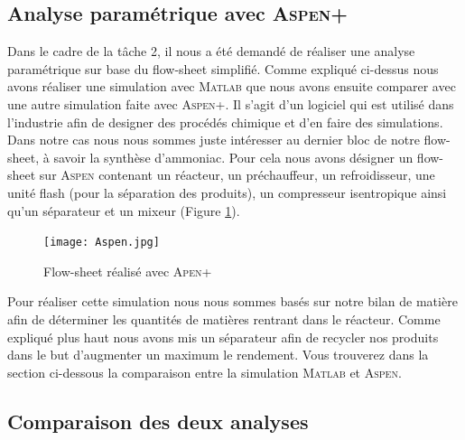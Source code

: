 \subsection{Analyse paramétrique avec \textsc{Aspen+}}
Dans le cadre de la tâche 2, il nous a été demandé de réaliser une analyse paramétrique sur base du flow-sheet simplifié. Comme expliqué ci-dessus nous avons réaliser une simulation avec \textsc{Matlab} que nous avons ensuite comparer avec une autre simulation faite avec \textsc{Aspen+}. Il s'agit d'un logiciel qui est utilisé dans l'industrie afin de designer des procédés chimique et d'en faire des simulations. Dans notre cas nous nous sommes juste intéresser au dernier bloc de notre flow-sheet, à savoir la synthèse d'ammoniac. Pour cela nous avons désigner un flow-sheet sur \textsc{Aspen} contenant un réacteur, un préchauffeur, un refroidisseur, une unité flash (pour la séparation des produits), un compresseur isentropique ainsi qu'un séparateur et un mixeur (Figure \ref{Aspen}).
\begin{figure}[ht!]
 \centering
 \texttt{[image: Aspen.jpg]}
 \caption{Flow-sheet réalisé avec \textsc{Apen+}}
 \label{Aspen}
\end{figure}
Pour réaliser cette simulation nous nous sommes basés sur notre bilan de matière afin de déterminer les quantités de matières rentrant dans le réacteur. Comme expliqué plus haut nous avons mis un séparateur afin de recycler nos produits dans le but d'augmenter un maximum le rendement. Vous trouverez dans la section ci-dessous la comparaison entre la simulation \textsc{Matlab} et \textsc{Aspen}.
\subsection{Comparaison des deux analyses}

